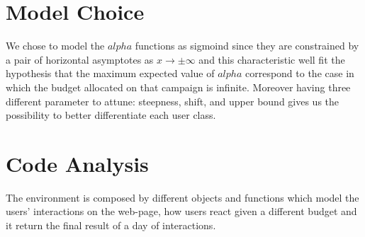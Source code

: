 \section{Model Choice}
\label{sec:env_Motivation}
We chose to model the $alpha$ functions as sigmoind since they are constrained by a pair of horizontal asymptotes as $ x\to\pm\infty$  and this characteristic well fit the hypothesis that the maximum expected value of $alpha$ correspond to the case in which the budget allocated on that campaign is infinite. Moreover having three different parameter to attune: steepness, shift, and upper bound  gives us the possibility to better differentiate each user class.

\section{Code Analysis}
\label{sec:env_Code Analysis}

The environment is composed by different objects and functions which model the users' interactions on the web-page, how users react given a different budget and it  return the final result of a day of interactions.
 
